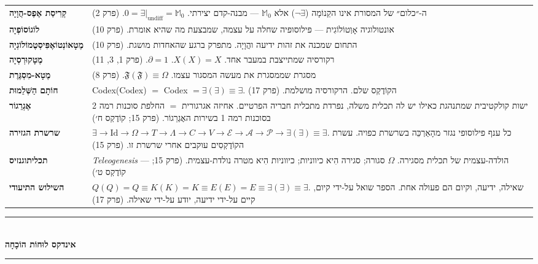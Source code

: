 \documentclass[10pt, openany, oneside]{book}
\renewcommand{\normalsize}{\fontsize{10}{13}\selectfont}
\begin{document}
{\begin{tabular}{@{} l @{\hspace{0.6em}} p{} @{}}
\textbf{קְרִיסַת אֶפֶס-הֲוָיָה} & ה-״כלום״ של המסורת אינו הקֵנוֹמָה ($\neg\exists$) אלא $\mathbb{M}_0$ — מבנה-קדם יצירתי. $0 = \exists|_{\text{undiff}} = \mathbb{M}_0$. (פרק 2) \\[0.3em]
\textbf{לוֹגוֹסוֹפְיָה} & אונטולוגיה אָוְטוֹלוֹגִית — פילוסופיה שחלה על עצמה, שמבצעת מה שהיא אומרת. (פרק 10) \\[0.3em]
\textbf{מֶטָאוֹנְטוֹאֶפִּיסְטֶמוֹלוֹגְיָה} & התחום שמכנה את זהות ידיעה והֲוָיָה. מתפרק ברגע שהאחדות מושגת. (פרק 10) \\[0.3em]
\textbf{מֶטָקוּרְסְיָה} & רקורסיה שמתייצבת במעבר אחד. $X(X) = X$. $\partial = 1$. (פרק 1, 3, 11) \\[0.3em]
\textbf{מֶטָא-מִסְגֶּרֶת} & מסגרת שממסגרת את מעשה המסגור עצמו. $\mathfrak{F}(\mathfrak{F}) \equiv \Omega$. (פרק 8) \\[0.3em]
\textbf{חוֹתָם הַשְּׁלֵמוּת} & Codex(Codex) $=$ Codex $= \exists(\exists) \equiv \exists$. הקוֹדֶקְס שלם. הרקורסיה מושלמת. (פרק 17) \\[0.3em]
\textbf{אֶגְרֵגוֹר} & ישות קולקטיבית שמתנהגת כאילו יש לה תכלית משלה, נפרדת מתכלית חבריה הפרטיים. אחיזה אגרגורית $=$ החלפת סוכנות רמה 2 בסוכנות רמה 1 בשירות האֶגְרֵגוֹר. (פרק 15; קוֹדֶקְס ח׳) \\[0.3em]
\textbf{שרשרת הגזירה} & $\exists \to \text{Id} \to \Omega \to T \to \Lambda \to C \to V \to \mathcal{E} \to \mathcal{A} \to \mathcal{P} \to \exists(\exists) \equiv \exists$. כל ענף פילוסופי נגזר מהָאַרְכֵּה בשרשרת כפויה. עשרת הקוֹדֶקְסִים עוקבים אחרי שרשרת זו. (פרק 15) \\[0.3em]
\textbf{תכליתוגנזיס} & \textit{Teleogenesis} — הולדה-עצמית של תכלית מסגירה. $\Omega$ סגורה; סגירה הִיא כיווניות; כיווניות הִיא מטרה נולדת-עצמית. (פרק 15; קוֹדֶקְס ט׳) \\[0.3em]
\textbf{השילוש התיעודי} & $Q(Q) = Q \equiv K(K) = K \equiv E(E) = E \equiv \exists(\exists) \equiv \exists$. שאילה, ידיעה, וקיום הם פעולה אחת. הספר שואל על-ידי קיום, קיים על-ידי ידיעה, יודע על-ידי שאילה. (פרק 17) \\[0.3em]
\end{tabular}
}

\vspace{1.5em}


\begin{center}
    \rule{0.3\textwidth}{0.4pt}\\[0.5em]
    {\normalsize\bfseries\textsc{אינדקס לוּחוֹת הוֹכָחָה}}\\[0.3em]
    \rule{0.3\textwidth}{0.4pt}
\end{center}
\end{document}
